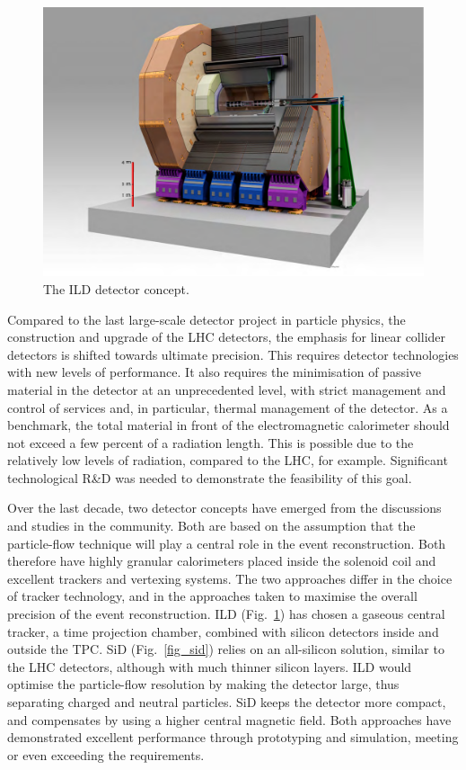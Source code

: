 \documentclass[%
reprint,
 floatfix,
 amsmath,amssymb,
 aps,
]{revtex4-1}
\def\Fig#1{Fig.~\ref{#1}}
\begin{document}
\begin{figure}[tb]
 \begin{center}
 \includegraphics[width=0.9\hsize]{figures/ILD.pdf}
\caption{The ILD detector concept.
\label{fig_ild}}
 \end{center}
 \vspace{-0.7cm}
 \end{figure}
 
Compared to the last large-scale detector project in particle physics,
the construction and upgrade of the LHC detectors, the 
emphasis for linear collider detectors
 is shifted towards ultimate precision. This requires detector technologies
with new levels of performance.  It also requires the  minimisation of
passive material in the detector at an unprecedented level, with strict
management and control of services and, in particular,
thermal management of the detector.  As a benchmark,  the total
material in front of the electromagnetic calorimeter should not exceed
a few percent of a radiation length. 
This is possible due to the relatively low levels
of radiation, compared to the LHC, for example.
Significant technological R\&D was needed to
demonstrate the feasibility of this goal. 



Over the last decade, two detector concepts have emerged from the
discussions and studies in the community. Both are based on the assumption that
the 
particle-flow technique will  play a central role in the event
reconstruction. Both therefore have highly granular calorimeters
placed inside the solenoid coil
and excellent trackers and vertexing systems. The two approaches
differ in the choice of tracker technology, and in the approaches taken
to maximise the overall precision of the event reconstruction. ILD
(\Fig{fig_ild}) has chosen a gaseous central tracker, a time
projection chamber, combined with silicon detectors inside and outside
the TPC. SiD (\Fig{fig_sid}) relies on an all-silicon solution,
similar to the
 LHC detectors, although with
much thinner silicon layers. ILD would optimise the particle-flow
resolution by making the detector large, thus separating charged and
neutral particles. SiD keeps the detector more compact, and
compensates by using a higher central magnetic field. Both approaches
have demonstrated excellent performance through prototyping
 and simulation, meeting or even exceeding the requirements. 
\end{document}
